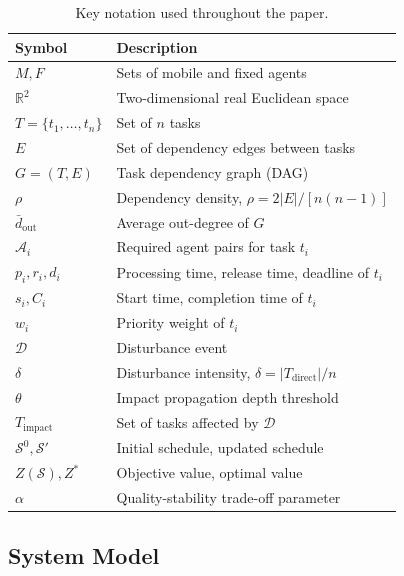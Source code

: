 \documentclass[manuscript,screen,review]{acmart}
\begin{document}
\begin{table}[t]
    \centering
    \caption{Key notation used throughout the paper.}
    \label{tab:notation}
    \small
    \begin{tabular}{@{}ll@{}}
        \toprule
        \textbf{Symbol} & \textbf{Description} \\
        \midrule
        $M, F$              & Sets of mobile and fixed agents \\
		$\mathbb{R}^2$ 		& Two-dimensional real Euclidean space \\
        $T = \{t_1,\ldots,t_n\}$ & Set of $n$ tasks \\
		$E$ 				& Set of dependency edges between tasks \\
        $G = (T, E)$        & Task dependency graph (DAG) \\
        $\rho$              & Dependency density, $\rho = 2|E|/[n(n-1)]$ \\
        $\bar{d}_{\mathrm{out}}$ & Average out-degree of $G$ \\
        $\mathcal{A}_i$     & Required agent pairs for task $t_i$ \\
        $p_i, r_i, d_i$     & Processing time, release time, deadline of $t_i$ \\
        $s_i, C_i$          & Start time, completion time of $t_i$ \\
        $w_i$               & Priority weight of $t_i$ \\
        $\mathcal{D}$       & Disturbance event \\
        $\delta$            & Disturbance intensity, $\delta = |T_{\mathrm{direct}}|/n$ \\
        $\theta$            & Impact propagation depth threshold \\
        $T_{\mathrm{impact}}$ & Set of tasks affected by $\mathcal{D}$ \\
        $\mathcal{S}^0, \mathcal{S}'$ & Initial schedule, updated schedule \\
        $Z(\mathcal{S}), Z^*$ & Objective value, optimal value \\
        $\alpha$            & Quality-stability trade-off parameter \\
        \bottomrule
    \end{tabular}
\end{table}

\subsection{System Model}
\label{subsec:system_model}
\end{document}
